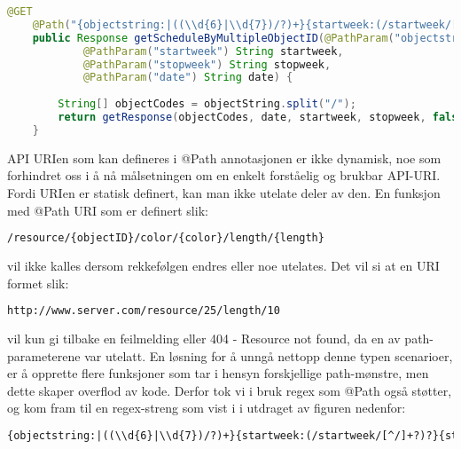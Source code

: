 \documentclass[../main.tex]{subfiles}
\begin{document}
\begin{lstlisting}[language=Java, frame=single, caption={Utdrag fra klassen TimeEditService som viser en JAX-RS annotert funksjon.}]
    @GET
    @Path("{objectstring:|((\\d{6}|\\d{7})/?)+}{startweek:(/startweek/[^/]+?)?}{stopweek:(/stopweek/[^/]+?)?}{date:(/date/[^/]+?)?}")
    public Response getScheduleByMultipleObjectID(@PathParam("objectstring") String objectString,
            @PathParam("startweek") String startweek,
            @PathParam("stopweek") String stopweek,
            @PathParam("date") String date) {
       
        String[] objectCodes = objectString.split("/");        
        return getResponse(objectCodes, date, startweek, stopweek, false);
    }
\end{lstlisting}

API URIen som kan defineres i @Path annotasjonen er ikke dynamisk, noe som forhindret oss i å nå målsetningen om en enkelt forståelig og brukbar API-URI. Fordi URIen er statisk definert, kan man ikke utelate deler av den. En funksjon med @Path URI som er definert slik:

\begin{lstlisting}[language=HTML, frame=single, caption={Eksempel på en statisk definert URI}]
/resource/{objectID}/color/{color}/length/{length}
\end{lstlisting}

vil ikke kalles dersom rekkefølgen endres eller noe utelates. Det vil si at en URI formet slik:

\begin{lstlisting}[language=HTML, frame=single, caption={Eksempel på en URI}]
http://www.server.com/resource/25/length/10
\end{lstlisting}

vil kun gi tilbake en feilmelding eller 404 - Resource not found, da en av path-parameterene var utelatt. En løsning for å unngå nettopp denne typen scenarioer, er å opprette flere funksjoner som tar i hensyn forskjellige path-mønstre, men dette skaper overflod av kode.
Derfor tok vi i bruk regex som @Path også støtter, og kom fram til en regex-streng som vist i i utdraget av figuren nedenfor:

\begin{lstlisting}[language=HTML, frame=single, caption={Selve strengen inne i en @Path variabel med regex}]
{objectstring:|((\\d{6}|\\d{7})/?)+}{startweek:(/startweek/[^/]+?)?}{stopweek:(/stopweek/[^/]+?)?}{date:(/date/[^/]+?)?}
\end{lstlisting}
\end{document}
